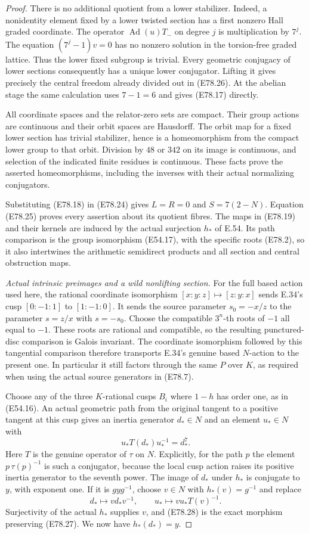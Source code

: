 \begin{proof}
There is no additional quotient from a lower
stabilizer. Indeed, a nonidentity element fixed
by a lower twisted section has a first
nonzero Hall graded coordinate. The operator
$\operatorname{Ad}(u)T_-$ on degree $j$
is multiplication by $7^j$. The equation
$(7^j-1)v=0$ has no nonzero solution in the
torsion-free graded lattice. Thus the lower
fixed subgroup is trivial.
Every geometric conjugacy of lower sections
consequently has a unique lower conjugator.
Lifting it gives precisely the central
freedom already divided out in (E78.26).
At the abelian stage the same calculation
uses $7-1=6$ and gives (E78.17) directly.

All coordinate spaces and the relator-zero
sets are compact. Their group actions are
continuous and their orbit spaces are
Hausdorff. The orbit map for a fixed lower
section has trivial stabilizer, hence is a
homeomorphism from the compact lower group
to that orbit. Division by $48$ or $342$
on its image is continuous, and selection
of the indicated finite residues is
continuous. These facts prove the asserted
homeomorphisms, including the inverses
with their actual normalizing conjugators.

Substituting (E78.18) in (E78.24)
gives $L=R=0$ and $S=7(2-N)$.
Equation (E78.25) proves every assertion
about its quotient fibres. The maps in (E78.19)
and their kernels are induced by the
actual surjection $h_*$ of E.54.
Its path comparison is the group
isomorphism (E54.17), with the specific
roots (E78.2), so it also intertwines the
arithmetic semidirect products and all
section and central obstruction maps.

\emph{Actual intrinsic preimages and a wild nonlifting
section.}
For the full based action used here, the rational coordinate
isomorphism $[x:y:z]\mapsto[z:y:x]$ sends E.34's cusp
$[0:-1:1]$ to $[1:-1:0]$. It sends the source parameter
$s_0=-x/z$ to the parameter $s=z/x$ with $s=-s_0$.
Choose the compatible $3^n$-th roots of $-1$ all equal
to $-1$. These roots are rational and compatible, so
the resulting punctured-disc comparison is Galois invariant.
The coordinate isomorphism followed by this tangential
comparison therefore transports E.34's genuine based
$N$-action to the present one. In particular it still
factors through the same $P$ over $K$, as required when
using the actual source generators in (E78.7).

Choose any of the three $K$-rational cusps $B_i$
where $1-h$ has order one, as in (E54.16).
An actual geometric path from the original tangent
to a positive tangent at this cusp gives an inertia
generator $d_*\in N$ and an element $u_*\in N$
with
\[
                 u_*T(d_*)u_*^{-1}=d_*^7 .
 \tag{E78.27}
\]
Here $T$ is the genuine operator of $\tau$ on $N$.
Explicitly, for the path $p$ the element
$p\,\tau(p)^{-1}$ is such a conjugator, because
the local cusp action raises its positive
inertia generator to the seventh power.
The image of $d_*$ under $h_*$ is conjugate to
$y$, with exponent one. If it is $g y g^{-1}$,
choose $v\in N$ with $h_*(v)=g^{-1}$ and replace
\[
 d_*\longmapsto vd_*v^{-1},\qquad
 u_*\longmapsto vu_*T(v)^{-1}.
 \tag{E78.28}
\]
Surjectivity of the actual $h_*$ supplies $v$,
and (E78.28) is the exact morphism preserving
(E78.27). We now have $h_*(d_*)=y$.


\end{proof}
